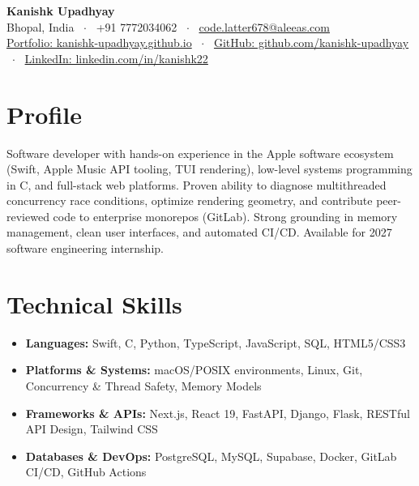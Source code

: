 \documentclass[10pt,a4paper]{article}
\begin{document}
\begin{center}
    {\huge \textbf{Kanishk Upadhyay}} \\ \vspace{2pt}
    Bhopal, India \ $\cdot$ \ +91 7772034062 \ $\cdot$ \ \href{mailto:code.latter678@aleeas.com}{code.latter678@aleeas.com} \\ \vspace{2pt}
    \href{https://kanishk-upadhyay.github.io/}{Portfolio: kanishk-upadhyay.github.io} \ $\cdot$ \ 
    \href{https://github.com/kanishk-upadhyay}{GitHub: github.com/kanishk-upadhyay} \ $\cdot$ \ 
    \href{https://linkedin.com/in/kanishk22}{LinkedIn: linkedin.com/in/kanishk22}
\end{center}

\vspace{-6pt}
\section{Profile}
Software developer with hands-on experience in the Apple software ecosystem (Swift, Apple Music API tooling, TUI rendering), low-level systems programming in C, and full-stack web platforms. Proven ability to diagnose multithreaded concurrency race conditions, optimize rendering geometry, and contribute peer-reviewed code to enterprise monorepos (GitLab). Strong grounding in memory management, clean user interfaces, and automated CI/CD. Available for 2027 software engineering internship.

\section{Technical Skills}
\begin{itemize}
    \item \textbf{Languages:} Swift, C, Python, TypeScript, JavaScript, SQL, HTML5/CSS3
    \item \textbf{Platforms \& Systems:} macOS/POSIX environments, Linux, Git, Concurrency \& Thread Safety, Memory Models
    \item \textbf{Frameworks \& APIs:} Next.js, React 19, FastAPI, Django, Flask, RESTful API Design, Tailwind CSS
    \item \textbf{Databases \& DevOps:} PostgreSQL, MySQL, Supabase, Docker, GitLab CI/CD, GitHub Actions
\end{itemize}
\end{document}
